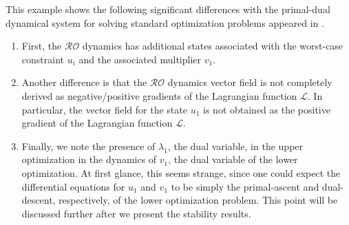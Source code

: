 \documentclass[journal,twoside,web]{ieeecolor}
\begin{document}
This example shows the following significant differences with the primal-dual dynamical system for solving standard optimization problems appeared in \cite{feijer2010,cherukuri2016}.
\begin{enumerate}
\item First, the $\mathcal{RO}$ dynamics has additional states associated with the worst-case constraint $u_i$ and the associated multiplier $v_1$.
 \item Another difference is that the $\mathcal{RO}$ dynamics vector field is not completely derived as negative/positive gradients of the Lagrangian function $\mathcal{L}$. In particular, the vector field for the state $u_1$ is not obtained as the positive gradient of the Lagrangian function $\mathcal{L}$.
\item Finally, we note the presence of $\lambda_1$, the dual variable, in the upper optimization in the dynamics of $v_1$, the dual variable of the lower optimization. At first glance, this seems strange, since one could expect the differential equations for $u_1$ and $v_1$ to be simply the primal-ascent and dual-descent, respectively, of the lower optimization problem. This point will be discussed further after we present the stability results.
\end{enumerate}
\end{document}
